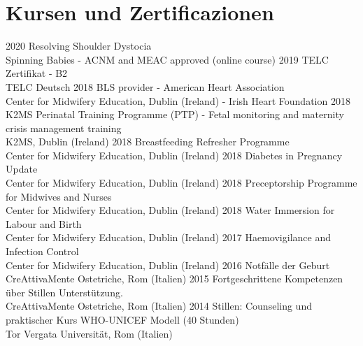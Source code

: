 \documentclass[11pt]{friggeri-cv}
\begin{document}
\section{Kursen und Zertificazionen}
\begin{entrylist}
  \entry
    {2020}
    {Resolving Shoulder Dystocia}
    {\\Spinning Babies - ACNM and MEAC approved (online course)}
    {\vspace{-10pt}}
  \entry
    {2019}
    {TELC Zertifikat - B2}
    {\\TELC Deutsch}
    {\vspace{-10pt}}
  \entry
    {2018}
    {BLS provider - American Heart Association}
    {\\Center for Midwifery Education, Dublin (Ireland) - Irish Heart Foundation}
    {\vspace{-10pt}}
  \entry
    {2018}
    {K2MS Perinatal Training Programme (PTP) - Fetal monitoring and maternity crisis management training}
    {\\K2MS, Dublin (Ireland)}
    {\vspace{-10pt}}
  \entry
    {2018}
    {Breastfeeding Refresher Programme}
    {\\Center for Midwifery Education, Dublin (Ireland)}
    {\vspace{-10pt}}
  \entry
    {2018}
    {Diabetes in Pregnancy Update}
    {\\Center for Midwifery Education, Dublin (Ireland)}
    {\vspace{-10pt}}
  \entry
    {2018}
    {Preceptorship Programme for Midwives and Nurses}
    {\\Center for Midwifery Education, Dublin (Ireland)}
    {\vspace{-10pt}}
  \entry
    {2018}
    {Water Immersion for Labour and Birth}
    {\\Center for Midwifery Education, Dublin (Ireland)}
    {\vspace{-10pt}}
  \entry
    {2017}
    {Haemovigilance and Infection Control}
    {\\Center for Midwifery Education, Dublin (Ireland)}
    {\vspace{-10pt}}
  \entry
    {2016}
    {Notf\"{a}lle der Geburt}
    {\\CreAttivaMente Ostetriche, Rom (Italien)}
    {\vspace{-10pt}}
  \entry
    {2015}
    {Fortgeschrittene Kompetenzen \"{u}ber Stillen Unterst\"{u}tzung.}
    {\\CreAttivaMente Ostetriche, Rom (Italien)}
    {\vspace{-10pt}}
  \entry
    {2014}
    {Stillen: Counseling und praktischer Kurs WHO-UNICEF Modell (40 Stunden)}
    {\\Tor Vergata Universit\"{a}t, Rom (Italien)}
    {\vspace{-10pt}}
\end{entrylist}
\end{document}
